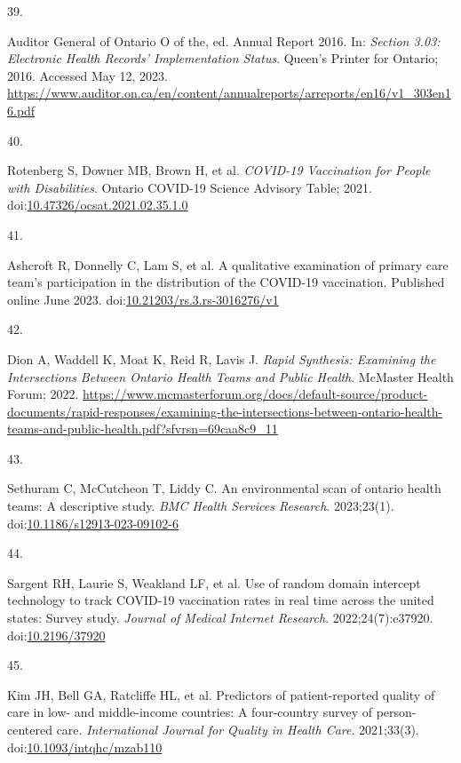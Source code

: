 \documentclass[
]{article}
\newlength{\cslhangindent}
\newlength{\csllabelwidth}
\newlength{\cslentryspacingunit} %
\newenvironment{CSLReferences}[2] %
 {%
  \setlength{\parindent}{0pt}
  \ifodd #1
  \let\oldpar\par
  \def\par{\hangindent=\cslhangindent\oldpar}
  \fi
  \setlength{\parskip}{#2\cslentryspacingunit}
 }%
 {}
\newcommand{\CSLLeftMargin}[1]{\parbox[t]{\csllabelwidth}{#1}}
\newcommand{\CSLRightInline}[1]{\parbox[t]{\linewidth - \csllabelwidth}{#1}\break}
\begin{document}
\begin{CSLReferences}{0}{0}
\leavevmode{}%
\CSLLeftMargin{39. }%
\CSLRightInline{Auditor General of Ontario O of the, ed. Annual {R}eport
2016. In: \emph{Section 3.03: Electronic Health Records' Implementation
Status}. Queen's Printer for Ontario; 2016. Accessed May 12, 2023.
\url{https://www.auditor.on.ca/en/content/annualreports/arreports/en16/v1_303en16.pdf}}

\leavevmode{}%
\CSLLeftMargin{40. }%
\CSLRightInline{Rotenberg S, Downer MB, Brown H, et al. \emph{{COVID}-19
Vaccination for People with Disabilities}. Ontario {COVID}-19 Science
Advisory Table; 2021.
doi:\href{https://doi.org/10.47326/ocsat.2021.02.35.1.0}{10.47326/ocsat.2021.02.35.1.0}}

\leavevmode{}%
\CSLLeftMargin{41. }%
\CSLRightInline{Ashcroft R, Donnelly C, Lam S, et al. A qualitative
examination of primary care team's participation in the distribution of
the {COVID}-19 vaccination. Published online June 2023.
doi:\href{https://doi.org/10.21203/rs.3.rs-3016276/v1}{10.21203/rs.3.rs-3016276/v1}}

\leavevmode{}%
\CSLLeftMargin{42. }%
\CSLRightInline{Dion A, Waddell K, Moat K, Reid R, Lavis J. \emph{Rapid
Synthesis: Examining the Intersections Between Ontario Health Teams and
Public Health}. McMaster Health Forum; 2022.
\url{https://www.mcmasterforum.org/docs/default-source/product-documents/rapid-responses/examining-the-intersections-between-ontario-health-teams-and-public-health.pdf?sfvrsn=69caa8c9_11}}

\leavevmode{}%
\CSLLeftMargin{43. }%
\CSLRightInline{Sethuram C, McCutcheon T, Liddy C. An environmental scan
of ontario health teams: A descriptive study. \emph{{BMC} Health
Services Research}. 2023;23(1).
doi:\href{https://doi.org/10.1186/s12913-023-09102-6}{10.1186/s12913-023-09102-6}}

\leavevmode{}%
\CSLLeftMargin{44. }%
\CSLRightInline{Sargent RH, Laurie S, Weakland LF, et al. Use of random
domain intercept technology to track {COVID}-19 vaccination rates in
real time across the united states: Survey study. \emph{Journal of
Medical Internet Research}. 2022;24(7):e37920.
doi:\href{https://doi.org/10.2196/37920}{10.2196/37920}}

\leavevmode{}%
\CSLLeftMargin{45. }%
\CSLRightInline{Kim JH, Bell GA, Ratcliffe HL, et al. Predictors of
patient-reported quality of care in low- and middle-income countries: A
four-country survey of person-centered care. \emph{International Journal
for Quality in Health Care}. 2021;33(3).
doi:\href{https://doi.org/10.1093/intqhc/mzab110}{10.1093/intqhc/mzab110}}


\end{CSLReferences}
\end{document}
